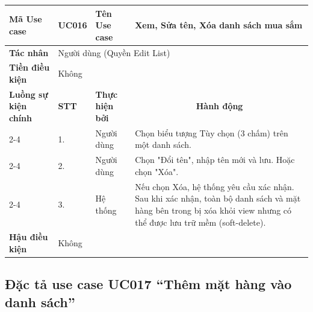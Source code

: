 \documentclass[../main.tex]{subfiles}
\begin{document}
\begin{longtable}{|p{2.7cm}|p{0.8cm}|p{2.6cm}|p{7.3cm}|}
\hline
\cellcolor[HTML]{D5F5E3}\textbf{Mã Use case} & \multicolumn{1}{l|}{UC016} & \cellcolor[HTML]{D5F5E3}\textbf{Tên Use case} & Xem, Sửa tên, Xóa danh sách mua sắm \\ \hline
\cellcolor[HTML]{D5F5E3}\textbf{Tác nhân} & \multicolumn{3}{p{10.7cm}|}{Người dùng (Quyền Edit List)} \\ \hline
\cellcolor[HTML]{D5F5E3}\textbf{Tiền điều kiện} & \multicolumn{3}{p{10.7cm}|}{Không} \\ \hline

\cellcolor[HTML]{D5F5E3}\textbf{Luồng sự kiện chính} & \cellcolor[HTML]{FDEBD0}\textbf{STT} & \cellcolor[HTML]{FDEBD0}\textbf{Thực hiện bởi} & \multicolumn{1}{c|}{\cellcolor[HTML]{FDEBD0}\textbf{Hành động}} \\ \cline{2-4} 
\cellcolor[HTML]{D5F5E3} & 1. & Người dùng & Chọn biểu tượng Tùy chọn (3 chấm) trên một danh sách. \\ \cline{2-4} 
\cellcolor[HTML]{D5F5E3} & 2. & Người dùng & Chọn "Đổi tên", nhập tên mới và lưu. Hoặc chọn "Xóa". \\ \cline{2-4} 
\cellcolor[HTML]{D5F5E3} & 3. & Hệ thống & Nếu chọn Xóa, hệ thống yêu cầu xác nhận. Sau khi xác nhận, toàn bộ danh sách và mặt hàng bên trong bị xóa khỏi view nhưng có thể được lưu trữ mềm (soft-delete). \\ \hline

\cellcolor[HTML]{D5F5E3}\textbf{Hậu điều kiện} & \multicolumn{3}{p{10.7cm}|}{Không} \\ \hline
\end{longtable}
\endgroup

\subsection{Đặc tả use case UC017 ``Thêm mặt hàng vào danh sách''}
\vspace{0.5cm}

\begingroup
\renewcommand{\arraystretch}{1.5}
\end{document}
